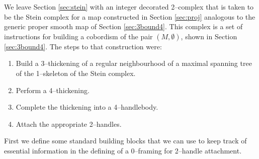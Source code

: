 We leave Section \ref{sec:stein} with an integer decorated 2--complex that is taken to be the Stein complex for a map constructed in Section \ref{sec:proj} analogous to the generic proper smooth map of Section \ref{sec:3bound4}.
This complex is a set of instructions for building a cobordism of the pair $(M,\emptyset)$, shown in Section \ref{sec:3bound4}.
The steps to that construction were:
\begin{enumerate}
	\item Build a 3--thickening of a regular neighbourhood of a maximal spanning tree of the 1--skeleton of the Stein complex.
	\item Perform a 4--thickening.
	\item Complete the thickening into a 4--handlebody.
	\item Attach the appropriate 2--handles.
\end{enumerate}
First we define some standard building blocks that we can use to keep track of essential information in the defining of a 0--framing for 2--handle attachment.

